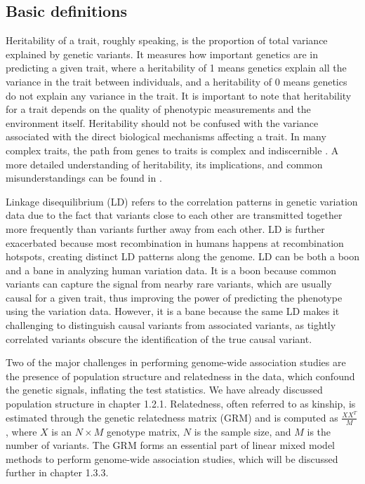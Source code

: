 \subsection{Basic definitions}

Heritability of a trait, roughly speaking, is the proportion of total variance explained by genetic variants. It measures how important genetics are in predicting a given trait, where a heritability of 1 means genetics explain all the variance in the trait between individuals, and a heritability of 0 means genetics do not explain any variance in the trait. It is important to note that heritability for a trait depends on the quality of phenotypic measurements and the environment itself. Heritability should not be confused with the variance associated with the direct biological mechanisms affecting a trait. In many complex traits, the path from genes to traits is complex and indiscernible \cite{Neale2017}. A more detailed understanding of heritability, its implications, and common misunderstandings can be found in \cite{Visscher2008,Gusev2021}.

Linkage disequilibrium (LD) refers to the correlation patterns in genetic variation data due to the fact that variants close to each other are transmitted together more frequently than variants further away from each other. LD is further exacerbated because most recombination in humans happens at recombination hotspots, creating distinct LD patterns along the genome. LD can be both a boon and a bane in analyzing human variation data. It is a boon because common variants can capture the signal from nearby rare variants, which are usually causal for a given trait, thus improving the power of predicting the phenotype using the variation data. However, it is a bane because the same LD makes it challenging to distinguish causal variants from associated variants, as tightly correlated variants obscure the identification of the true causal variant.

Two of the major challenges in performing genome-wide association studies are the presence of population structure and relatedness in the data, which confound the genetic signals, inflating the test statistics. We have already discussed population structure in chapter 1.2.1. Relatedness, often referred to as kinship, is estimated through the genetic relatedness matrix (GRM) and is computed as \(\frac{XX^T}{M}\), where \(X\) is an \(N \times M\) genotype matrix, \(N\) is the sample size, and \(M\) is the number of variants. The GRM forms an essential part of linear mixed model methods to perform genome-wide association studies, which will be discussed further in chapter 1.3.3.


